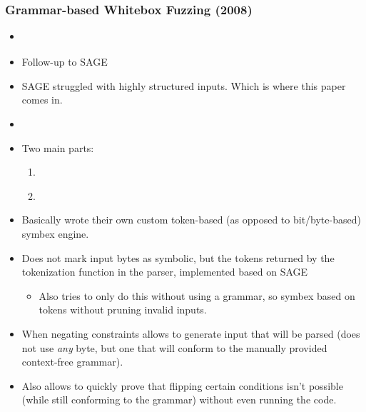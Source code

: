 \documentclass[12pt]{article}
\begin{document}
\subsubsection{Grammar-based Whitebox Fuzzing (2008)}
\begin{itemize}
    \item \cite{GrammarBasedWhiteboxFuzzing}
    \item Follow-up to SAGE\cite{SAGE}
    \item SAGE struggled with highly structured inputs. Which is where this paper comes in.
    \item {}\cite{GrammarBasedWhiteboxFuzzing}
    \item Two main parts:
          \begin{enumerate}
              \item {}\cite{GrammarBasedWhiteboxFuzzing}
              \item {}\cite{GrammarBasedWhiteboxFuzzing}
          \end{enumerate}
    \item Basically wrote their own custom token-based (as opposed to bit/byte-based) symbex engine.
    \item Does not mark input bytes as symbolic, but the tokens returned by the tokenization function in the parser, implemented based on SAGE\cite{SAGE}
          \begin{itemize}
              \item Also tries to only do this without using a grammar, so symbex based on tokens without pruning invalid inputs.
          \end{itemize}
    \item When negating constraints allows to generate input that will be parsed (does not use \textit{any} byte, but one that will conform to the manually provided context-free grammar).
    \item Also allows to quickly prove that flipping certain conditions isn't possible (while still conforming to the grammar) without even running the code.

\end{itemize}
\end{document}

